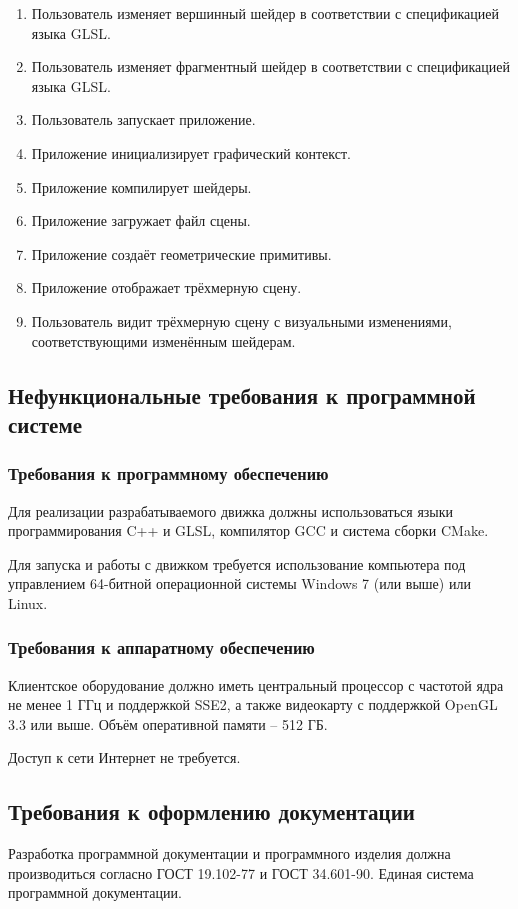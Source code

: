 \begin{enumerate}
    \item Пользователь изменяет вершинный шейдер в соответствии с спецификацией языка GLSL.
    \item Пользователь изменяет фрагментный шейдер в соответствии с спецификацией языка GLSL.
    \item Пользователь запускает приложение.
    \item Приложение инициализирует графический контекст.
    \item Приложение компилирует шейдеры.
    \item Приложение загружает файл сцены.
    \item Приложение создаёт геометрические примитивы.
    \item Приложение отображает трёхмерную сцену.
    \item Пользователь видит трёхмерную сцену с визуальными изменениями, соответствующими изменённым шейдерам.
\end{enumerate}

\subsection{Нефункциональные требования к программной системе}

\subsubsection{Требования к программному обеспечению}

Для реализации разрабатываемого движка должны использоваться языки программирования C++ и GLSL, компилятор GCC и система сборки CMake.

Для запуска и работы с движком требуется использование компьютера под управлением 64-битной операционной системы Windows 7 (или выше) или Linux.

\subsubsection{Требования к аппаратному обеспечению}

Клиентское оборудование должно иметь центральный процессор с частотой ядра не менее 1 ГГц и поддержкой SSE2, а также видеокарту с поддержкой OpenGL 3.3 или выше. Объём оперативной памяти -- 512 ГБ.

Доступ к сети Интернет не требуется.

\subsection{Требования к оформлению документации}

Разработка программной документации и программного изделия должна производиться согласно ГОСТ 19.102-77 и ГОСТ 34.601-90. Единая система программной документации.
